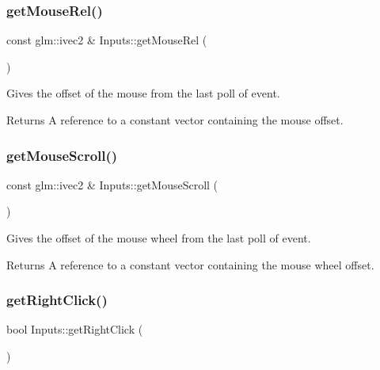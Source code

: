 \subsubsection{\texorpdfstring{get\+Mouse\+Rel()}{getMouseRel()}}
{\footnotesize\ttfamily const glm\+::ivec2 \& Inputs\+::get\+Mouse\+Rel (\begin{DoxyParamCaption}{ }\end{DoxyParamCaption})\hspace{0.3cm}{\ttfamily [static]}}

Gives the offset of the mouse from the last poll of event.

\begin{DoxyReturn}{Returns}
A reference to a constant vector containing the mouse offset. 
\end{DoxyReturn}
\mbox{\label{class_inputs_ab73355bf19a30890703fea6dd27e00cf}} 
\subsubsection{\texorpdfstring{get\+Mouse\+Scroll()}{getMouseScroll()}}
{\footnotesize\ttfamily const glm\+::ivec2 \& Inputs\+::get\+Mouse\+Scroll (\begin{DoxyParamCaption}{ }\end{DoxyParamCaption})\hspace{0.3cm}{\ttfamily [static]}}

Gives the offset of the mouse wheel from the last poll of event.

\begin{DoxyReturn}{Returns}
A reference to a constant vector containing the mouse wheel offset. 
\end{DoxyReturn}
\mbox{\label{class_inputs_ad559cf15f96bdb20abeb3bb27ec891f6}} 
\subsubsection{\texorpdfstring{get\+Right\+Click()}{getRightClick()}}
{\footnotesize\ttfamily bool Inputs\+::get\+Right\+Click (\begin{DoxyParamCaption}{ }\end{DoxyParamCaption})\hspace{0.3cm}{\ttfamily [static]}}

